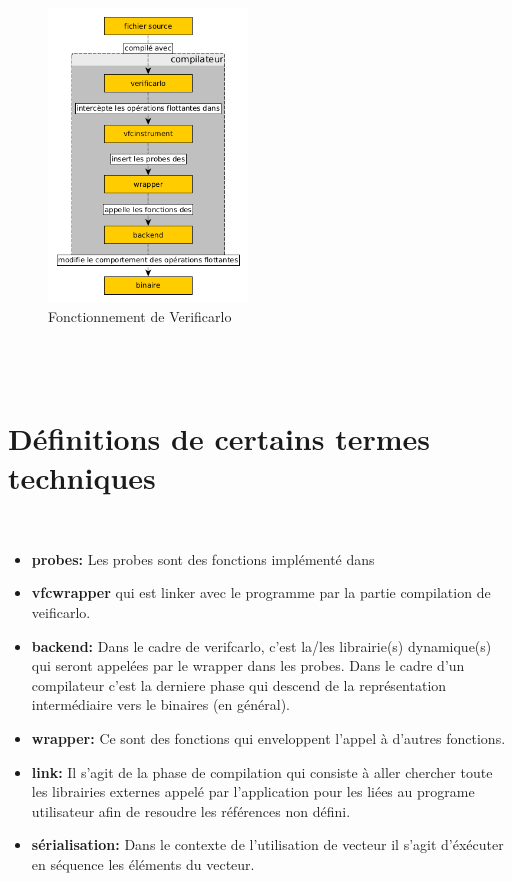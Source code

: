 \documentclass[11pt]{article}
\begin{document}
\\ \vspace{5mm}
\begin{figure}[htbp]
\centering
\includegraphics[width=200px]{../ressources/verificarlo_works.png}
\caption{\label{fig:orgfd31292}Fonctionnement de Verificarlo}
\end{figure}\\
\\ \vspace{5mm}
\section{Définitions de certains termes techniques}
\label{sec:org847d243}
\\ \vspace{5mm}
\begin{itemize}
\item \textbf{probes:} Les probes sont des fonctions implémenté dans

\item \textbf{vfcwrapper} qui est linker avec le programme par la partie
compilation de veificarlo.

\item \textbf{backend:} Dans le cadre de verifcarlo, c'est la/les librairie(s)
dynamique(s) qui seront appelées par le wrapper dans les
probes. Dans le cadre d'un compilateur c'est la derniere phase qui
descend de la représentation intermédiaire vers le binaires (en
général).

\item \textbf{wrapper:} Ce sont des fonctions qui enveloppent l'appel à
d'autres fonctions.

\item \textbf{link:} Il s'agit de la phase de compilation qui consiste à aller
chercher toute les librairies externes appelé par l'application
pour les liées au programe utilisateur afin de resoudre les
références non défini.

\item \textbf{sérialisation:} Dans le contexte de l'utilisation de vecteur il
s'agit d'éxécuter en séquence les éléments du vecteur.
\end{itemize}
\end{document}
